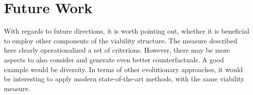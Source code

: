 \documentclass[12pt,a4paper]{report}
\begin{document}




\section{Future Work}
With regards to future directions, it is worth pointing out, whether it is beneficial to employ other components of the viability structure. The measure described here clearly operationalized a set of criterions. However, there may be more aspects to also consider and generate even better counterfactuals. A good example would be diversity. In terms of other evolutionary approaches, it would be interesting to apply modern state-of-the-art methods, with the same viability measure.


\end{document}
